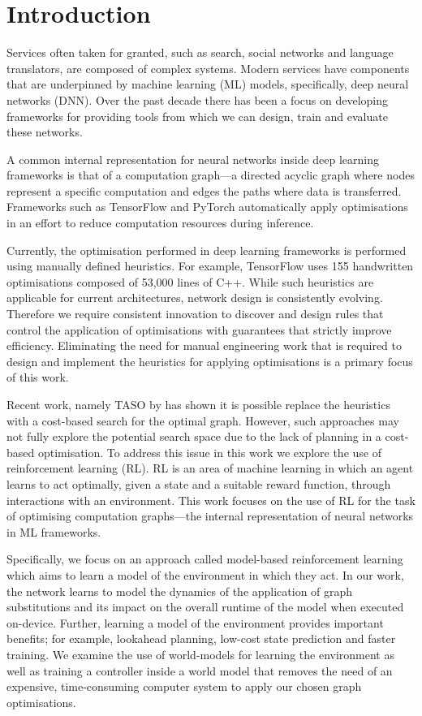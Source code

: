 \chapter{Introduction}

Services often taken for granted, such as search, social networks and language translators, are composed of complex systems. Modern services have components that are underpinned by machine learning (ML) models, specifically, deep neural networks (DNN). Over the past decade there has been a focus on developing frameworks for providing tools from which we can design, train and evaluate these networks.

A common internal representation for neural networks inside deep learning frameworks is that of a computation graph---a directed acyclic graph where nodes represent a specific computation and edges the paths where data is transferred. Frameworks such as TensorFlow \cite{tensorflow2015-whitepaper} and PyTorch \cite{pytorch} automatically apply optimisations in an effort to reduce computation resources during inference.

Currently, the optimisation performed in deep learning frameworks is performed using manually defined heuristics. For example, TensorFlow \cite{tensorflow2015-whitepaper} uses 155 handwritten optimisations composed of 53,000 lines of C++. While such heuristics are applicable for current architectures, network design is consistently evolving. Therefore we require consistent innovation to discover and design rules that control the application of optimisations with guarantees that strictly improve efficiency. Eliminating the need for manual engineering work that is required to design and implement the heuristics for applying optimisations is a primary focus of this work.

Recent work, namely TASO by \citet{jia2019taso,jia2019optimizing} has shown it is possible replace the heuristics with a cost-based search for the optimal graph. However, such approaches may not fully explore the potential search space due to the lack of planning in a cost-based optimisation. To address this issue in this work we explore the use of reinforcement learning (RL). RL is an area of machine learning in which an agent learns to act optimally, given a state and a suitable reward function, through interactions with an environment. This work focuses on the use of RL for the task of optimising computation graphs---the internal representation of neural networks in ML frameworks.

Specifically, we focus on an approach called model-based reinforcement learning which aims to learn a model of the environment in which they act. In our work, the network learns to model the dynamics of the application of graph substitutions and its impact on the overall runtime of the model when executed on-device. Further, learning a model of the environment provides important benefits; for example, lookahead planning, low-cost state prediction and faster training. We examine the use of world-models for learning the environment as well as training a controller inside a world model that removes the need of an expensive, time-consuming computer system to apply our chosen graph optimisations.

